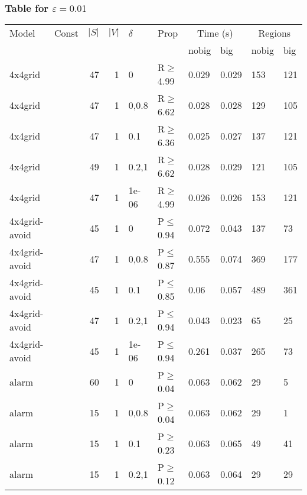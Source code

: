 \subsubsection{Table for \(\varepsilon=0.01\)}
\begin{longtable}{llrrllllll}

        \toprule
        Model & Const & $|S|$ & $|V|$ & $\delta$ & Prop & \multicolumn{2}{c}{Time (s)} & \multicolumn{2}{c}{Regions} \\
        \cmidrule(ll){7-8} \cmidrule(ll){9-10}
        & & & & & & nobig & big & nobig & big \\
        \midrule
        
 4x4grid       &          &     	47 & 1 & 0     & R$\geq$4.99  & 0.029   & 0.029    & 153    & 121    \\
 4x4grid       &          &     	47 & 1 & 0,0.8 & R$\geq$6.62  & 0.028   & 0.028    & 129    & 105    \\
 4x4grid       &          &     	47 & 1 & 0.1   & R$\geq$6.36  & 0.025   & 0.027    & 137    & 121    \\
 4x4grid       &          &     	49 & 1 & 0.2,1 & R$\geq$6.62  & 0.028   & 0.029    & 121    & 105    \\
 4x4grid       &          &     	47 & 1 & 1e-06 & R$\geq$4.99  & 0.026   & 0.026    & 153    & 121    \\
 4x4grid-avoid &          &     	45 & 1 & 0     & P$\leq$0.94  & 0.072   & 0.043    & 137    & 73     \\
 4x4grid-avoid &          &     	47 & 1 & 0,0.8 & P$\leq$0.87  & 0.555   & 0.074    & 369    & 177    \\
 4x4grid-avoid &          &     	45 & 1 & 0.1   & P$\leq$0.85  & 0.06    & 0.057    & 489    & 361    \\
 4x4grid-avoid &          &     	47 & 1 & 0.2,1 & P$\leq$0.94  & 0.043   & 0.023    & 65     & 25     \\
 4x4grid-avoid &          &     	45 & 1 & 1e-06 & P$\leq$0.94  & 0.261   & 0.037    & 265    & 73     \\
 alarm         &          &     	60 & 1 & 0     & P$\geq$0.04  & 0.063   & 0.062    & 29     & 5      \\
 alarm         &          &     	15 & 1 & 0,0.8 & P$\geq$0.04  & 0.063   & 0.062    & 29     & 1      \\
 alarm         &          &     	15 & 1 & 0.1   & P$\geq$0.23  & 0.063   & 0.065    & 49     & 41     \\
 alarm         &          &     	15 & 1 & 0.2,1 & P$\geq$0.12  & 0.063   & 0.064    & 29     & 29     \\

\end{longtable}
